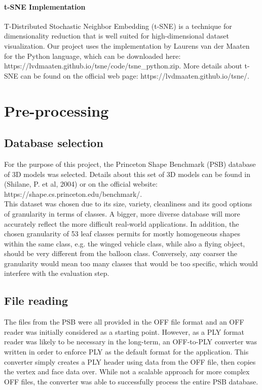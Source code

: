 \documentclass{bigdata}
\begin{document}
\paragraph{t-SNE Implementation}
T-Distributed Stochastic Neighbor Embedding (t-SNE) is a technique for dimensionality reduction that is well suited for high-dimensional dataset visualization. Our project uses the implementation by Laurens van der Maaten for the Python language, which can be downloaded here: https://lvdmaaten.github.io/tsne/code/tsne\_python.zip. More details about t-SNE can be found on the official web page: https://lvdmaaten.github.io/tsne/.

\section{Pre-processing}

\subsection{Database selection}
For the purpose of this project, the Princeton Shape Benchmark (PSB) database of 3D models was selected. Details about this set of 3D models can be found in (Shilane, P. et al, 2004) or on the official website: https://shape.cs.princeton.edu/benchmark/. \\
This dataset was chosen due to its size, variety, cleanliness and its good options of granularity in terms of classes. A bigger, more diverse database will more accurately reflect the more difficult real-world applications. In addition, the chosen granularity of 53 leaf classes permits for mostly homogeneous shapes within the same class, e.g. the winged vehicle class, while also a flying object, should be very different from the balloon class. Conversely, any coarser the granularity would mean too many classes that would be too specific, which would interfere with the evaluation step. 

\subsection{File reading}

The files from the PSB were all provided in the OFF file format and an OFF reader was initially considered as a starting point. However, as a PLY format reader was likely to be necessary in the long-term, an OFF-to-PLY converter was written in order to enforce PLY as the default format for the application.
This converter simply creates a PLY header using data from the OFF file, then copies the vertex and face data over. While not a scalable approach for more complex OFF files, the converter was able to successfully process the entire PSB database.
\end{document}
